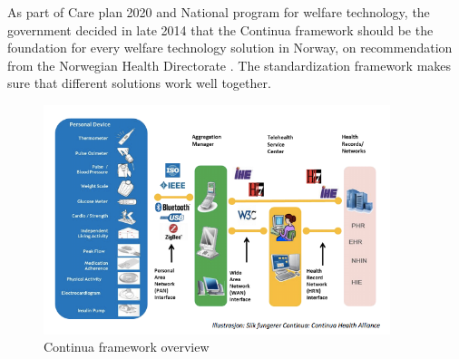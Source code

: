 As part of Care plan 2020 and National program for welfare technology, the government decided
in late 2014 that the Continua framework should be the foundation for every
welfare technology solution in Norway, on recommendation from the Norwegian Health Directorate \citep{regjeringen_continua}.
The standardization framework makes sure that different solutions work well together.

\begin{figure}
\includegraphics[width=0.9\textwidth,center]{fig/continua}
\caption{Continua framework overview}
\label{fig:continua}
\end{figure}
